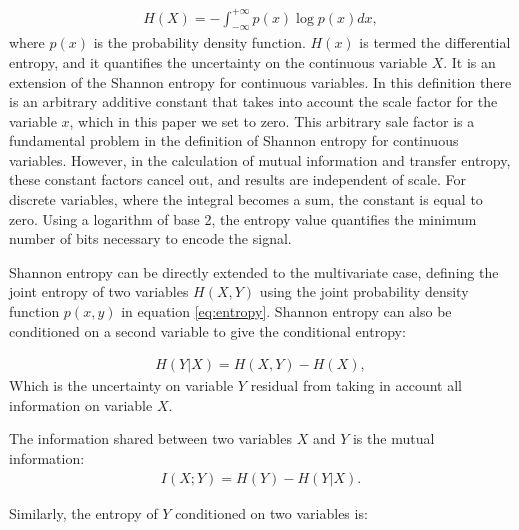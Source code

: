 \documentclass[]{rsos}%
\begin{document}
  \begin{eqnarray}
    \label{eq:entropy}
    H(X) = - \int_{-\infty}^{+\infty}  { p(x) \log{p(x)}  } dx,
  \end{eqnarray}
where $p(x)$ is the probability density function.   
$H(x)$ is termed the differential entropy, and it quantifies the uncertainty on the continuous variable $X$. It is an extension of the Shannon entropy for continuous variables. 
In this definition there is an arbitrary additive constant that takes into account the scale factor for the variable $x$, which in this paper we set to zero.
This arbitrary sale factor is a fundamental problem in the definition of Shannon entropy for continuous variables. 
However, in the calculation of mutual information and  transfer entropy, these constant factors cancel out, and results are independent of scale.
For discrete variables, where the integral becomes a sum, the constant is equal to zero. Using a logarithm of base 2, the entropy value quantifies the minimum number of bits necessary to encode the signal. 

 Shannon entropy can be directly extended to the multivariate case, defining the joint entropy of two variables $H(X,Y)$ using the joint probability density function $p(x,y)$ in equation \ref{eq:entropy}. Shannon entropy can also be conditioned on a second variable to give the conditional entropy:

  \begin{eqnarray}
    \label{eq:conditional_entropy_2D}
    H(Y | X) = H(X,Y) - H(X) ,
  \end{eqnarray}
Which is the uncertainty on variable $Y$ residual from taking in account all information on variable $X$. 

 The information shared between two variables $X$ and $Y$ is the mutual information:
  \begin{eqnarray}
    \label{eq:mutual_information}
    I(X;Y) = H(Y) - H(Y | X) .
  \end{eqnarray}
 
 Similarly, the entropy of $Y$ conditioned on two variables is:
\end{document}
